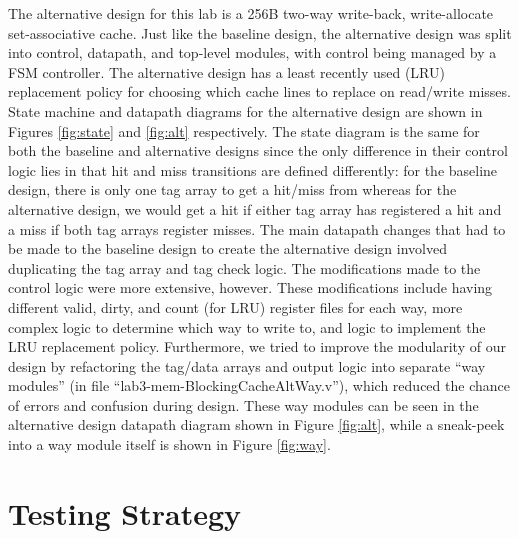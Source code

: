 \documentclass[10pt]{article}
\begin{document}
The alternative design for this lab is a 256B two-way write-back, write-allocate set-associative cache. Just like the baseline design, the alternative design was split into control, datapath, and top-level modules, with control being managed by a FSM controller. The alternative design has a least recently used (LRU) replacement policy for choosing which cache lines to replace on read/write misses. State machine and datapath diagrams for the alternative design are shown in Figures \ref{fig:state} and \ref{fig:alt} respectively. The state diagram is the same for both the baseline and alternative designs since the only difference in their control logic lies in that hit and miss transitions are defined differently: for the baseline design, there is only one tag array to get a hit/miss from whereas for the alternative design, we would get a hit if either tag array has registered a hit and a miss if both tag arrays register misses. 
The main datapath changes that had to be made to the baseline design to create the alternative design involved duplicating the tag array and tag check logic. The modifications made to the control logic were more extensive, however. These modifications include having different valid, dirty, and count (for LRU) register files for each way, more complex logic to determine which way to write to, and logic to implement the LRU replacement policy. Furthermore, we tried to improve the modularity of our design by refactoring the tag/data arrays and output logic into separate ``way modules'' (in file ``lab3-mem-BlockingCacheAltWay.v''), which reduced the chance of errors and confusion during design. These way modules can be seen in the alternative design datapath diagram shown in Figure \ref{fig:alt}, while a sneak-peek into a way module itself is shown in Figure \ref{fig:way}.  \\


\section{Testing Strategy}
\end{document}
